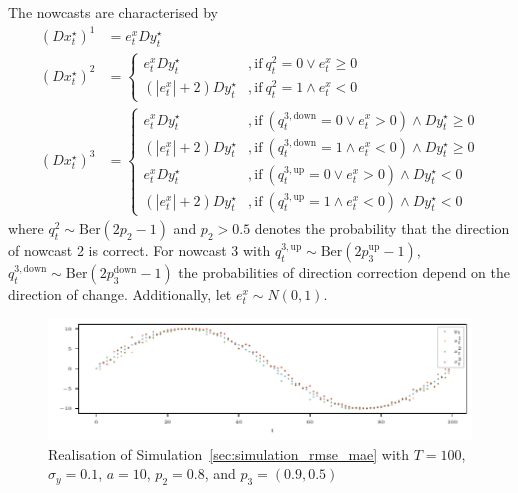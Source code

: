 \documentclass[oneside]{article}
\theoremstyle{plain}%
\theoremstyle{definition}
\newcommand{\ydifft}{Dy^\star}
\newcommand{\xdifft}{Dx^\star}
\begin{document}
The nowcasts are characterised by 
\begin{align}
	(\xdifft_t)^1 &= e^x_t \ydifft_t \\
	(\xdifft_t)^2 &= \begin{cases}
		e^x_t \ydifft_t &, \text{if}\ q^2_t = 0 \lor e^x_t \geq 0\\
		(| e^x_t | + 2) \ydifft_t &, \text{if}\ q^2_t = 1 \land e^x_t < 0
	\end{cases} \\
	(\xdifft_t)^3 &= \begin{cases}
		e^x_t \ydifft_t &, \text{if}\ (q^{3, \text{down}}_t = 0 \lor e^x_t > 0) \land \ydifft_t \geq 0\\
		(| e^x_t | + 2) \ydifft_t &, \text{if}\ (q^{3, \text{down}}_t = 1 \land e^x_t < 0) \land \ydifft_t \geq 0 \\
		e^x_t \ydifft_t &, \text{if}\ (q^{3, \text{up}}_t = 0 \lor e^x_t > 0) \land \ydifft_t < 0\\
		(| e^x_t | + 2) \ydifft_t &, \text{if}\ (q^{3, \text{up}}_t = 1 \land e^x_t < 0) \land \ydifft_t < 0
	\end{cases}
\end{align}
where $q^2_t \sim \text{Ber}(2p_2 - 1)$ and $p_2 > 0.5$ denotes the probability that the direction of nowcast 2 is correct.
For nowcast 3 with $q^{3, \text{up}}_t \sim \text{Ber}(2p_3^{\text{up}}-1)$, $q^{3, \text{down}}_t \sim \text{Ber}(2p_3^{\text{down}}-1)$ the probabilities of direction correction depend on the direction of change. Additionally, let $e^x_t \sim N(0, 1)$.

\begin{figure}
  \centering
  \includegraphics{plots/simulation_same_rmse_mae/time_series.pdf}
  \caption{Realisation of Simulation~\ref{sec:simulation_rmse_mae} with $T = 100$, $\sigma_y=0.1$, $a = 10$, $p_2 = 0.8$, and $p_3 = (0.9, 0.5)$}
  \label{fig:simulation_rmse_mae_ts}
\end{figure}
\end{document}
